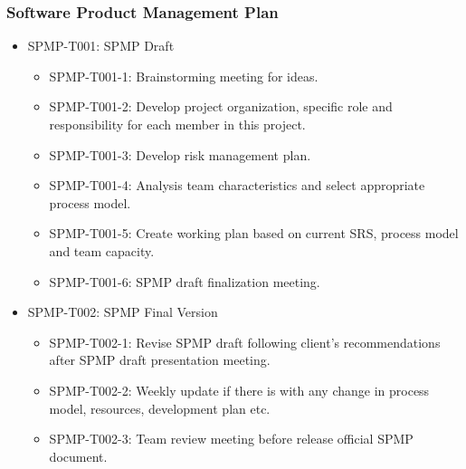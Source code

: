 	\subsubsection{Software Product Management Plan}
	\begin{itemize}
		\item SPMP-T001: SPMP Draft
		\begin{itemize}
			\item SPMP-T001-1: Brainstorming meeting for ideas.
			\item SPMP-T001-2: Develop project organization, specific role and responsibility for each member in this project.
			\item SPMP-T001-3: Develop risk management plan.
			\item SPMP-T001-4: Analysis team characteristics and select appropriate process model.  
			\item SPMP-T001-5: Create working plan based on current SRS, process model and team capacity.
			\item SPMP-T001-6: SPMP draft finalization meeting.
		\end{itemize}
		\item SPMP-T002: SPMP Final Version
		\begin{itemize}
			\item  SPMP-T002-1: Revise SPMP draft following client's recommendations after SPMP draft presentation meeting.
			\item  SPMP-T002-2: Weekly update if there is with any change in process model, resources, development plan etc.
			\item  SPMP-T002-3: Team review meeting before release official SPMP document.
		\end{itemize}
	\end{itemize}

